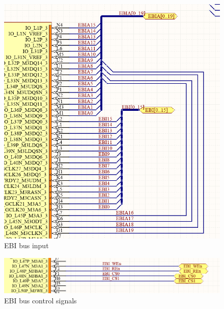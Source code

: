 \begin{figure}
    \includegraphics[width=\linewidth]{img/EBI-bus.png}
    \caption{EBI bus input}
    \label{fig:EbiBus}
\end{figure}

\begin{figure}
    \includegraphics[width=\linewidth]{img/EBI-bus_2.png}
    \caption{EBI bus control signals}
    \label{fig:EbiControl}
\end{figure}

